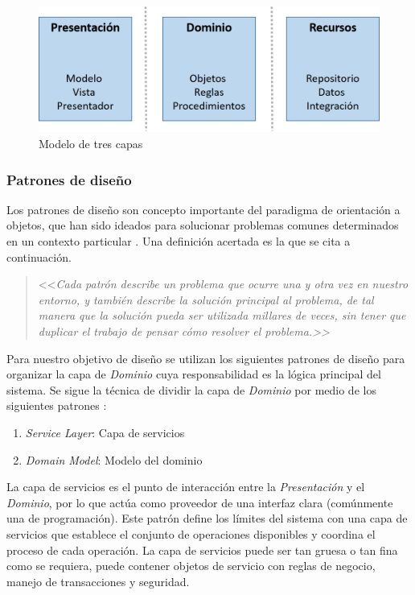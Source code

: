 \begin{figure}[H]
\begin{centering}
\includegraphics[width=0.8\columnwidth]{capitulo-5/graphics/arqui_tres_capas}
\par\end{centering}
\caption[Modelo de tres capas]{\label{fig5:tres_capas}Modelo de tres capas}

\end{figure}


\subsubsection{Patrones de diseño}

Los patrones de diseño son concepto importante del paradigma de orientación
a objetos, que han sido ideados para solucionar problemas comunes
determinados en un contexto particular \cite{Shalloway2004}. Una
definición acertada es la que se cita a continuación.
\begin{quotation}
<<\emph{Cada patrón describe un problema que ocurre una y otra vez
en nuestro entorno, y también describe la solución principal al problema,
de tal manera que la solución pueda ser utilizada millares de veces,
sin tener que duplicar el trabajo de pensar cómo resolver el problema.>>}
\cite{Alexander1977}
\end{quotation}
Para nuestro objetivo de diseño se utilizan los siguientes patrones
de diseño para organizar la capa de \emph{Dominio} cuya responsabilidad
es la lógica principal del sistema. Se sigue la técnica de dividir
la capa de\emph{ Dominio} por medio de los siguientes patrones \cite{Fowler2002}:
\begin{enumerate}
\item \emph{Service Layer}: Capa de servicios
\item \emph{Domain Model}: Modelo del dominio
\end{enumerate}
La capa de servicios es el punto de interacción entre la \emph{Presentación}
y el\emph{ Dominio}, por lo que actúa como proveedor de una interfaz
clara (comúnmente una  de programación). Este patrón define
los límites del sistema con una capa de servicios que establece el
conjunto de operaciones disponibles y coordina el proceso de cada
operación. La capa de servicios puede ser tan gruesa o tan fina como
se requiera, puede contener objetos de servicio con reglas de negocio,
manejo de transacciones y seguridad.

